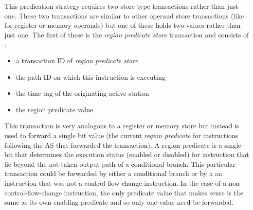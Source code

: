 \documentclass[10pt,dvips]{article}
\begin{document}
This predication strategy requires two store-type transactions
rather than just one.  These two transactions are similar
to other operand store transactions (like for register or memory
operands)
but one of these holds two values rather than just one.
The first of these is the \textit{region predicate store}
transaction and consists of :
%
\vspace{-0.05in}
\begin{itemize}
\vspace{-0.1in}
\item{a transaction ID of \textit{region predicate store}}
\vspace{-0.1in}
\item{the path ID on which this instruction is executing}
\vspace{-0.1in}
\item{the time tag of the originating active station}
\vspace{-0.1in}
\item{the region predicate value}
\vspace{-0.1in}
\end{itemize}   
%
This transaction is very analogous to a register or memory
store but instead is used to forward a single bit value (the
current \textit{region predicate} for instructions following the
AS that forwarded the transaction).  A region predicate
is a single bit that determines the execution status
(enabled or disabled) for instruction that lie beyond the
not-taken output path of a conditional branch.
This particular transaction could be forwarded by either
a conditional branch or by a an instruction that was not
a control-flow-change instruction.  In the
case of a non-control-flow-change instruction, the only
predicate value that makes sense is the same as its
own enabling predicate and so only one value need
be forwarded.
\end{document}
